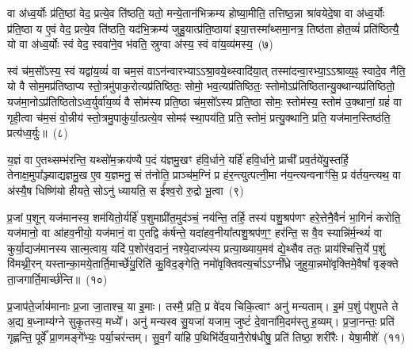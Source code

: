 वा अ॑ध्व॒र्योः प्र॑ति॒ष्ठां वेद॒ प्रत्ये॒व ति॑ष्ठति॒ यतो॒ मन्ये॒तान॑भिक्रम्य होष्या॒मीति॒ तत्तिष्ठ॒न्ना श्रा॑वयेदे॒षा वा अ॑ध्व॒र्योः प्र॑ति॒ष्ठा य ए॒वं वेद॒ प्रत्ये॒व ति॑ष्ठति॒ यद॑भि॒क्रम्य॑ जुहु॒यात्प्र॑ति॒ष्ठाया॑ इया॒त्तस्मा᳚थ्समा॒नत्र॒ तिष्ठ॑ता होत॒व्यं॑ प्रति॑ष्ठित्यै॒ यो वा अ॑ध्व॒र्योः स्वं वेद॒ स्ववा॑ने॒व भ॑वति॒ स्रुग्वा अ॑स्य॒ स्वं वा॑य॒व्य॑मस्य॒~(७)

स्वं च॑म॒सो᳚\-ऽस्य॒ स्वं यद्वा॑य॒व्यं॑ वा चम॒सं वा\-ऽन॑न्वारभ्याऽऽश्रा॒वये॒थ्\-स्वादि॑या॒त् तस्मा॑दन्वा॒रभ्या॒ऽऽश्राव्य॒ꣴ॒ स्वादे॒व नैति॒ यो वै सोम॒मप्र॑तिष्ठाप्य स्तो॒त्रमु॑पाक॒रोत्यप्र॑तिष्ठितः॒ सोमो॒ भव॒त्यप्र॑तिष्ठितः॒ स्तोमो\-ऽप्र॑तिष्ठितान्यु॒क्थान्यप्र॑तिष्ठितो॒ यज॑मा॒नो\-ऽप्र॑तिष्ठितो\-ऽध्व॒र्युर्वा॑य॒व्यं॑ वै सोम॑स्य प्रति॒ष्ठा च॑म॒सो᳚\-ऽस्य प्रति॒ष्ठा सोमः॒ स्तोम॑स्य॒ स्तोम॑ उ॒क्थानां॒ ग्रहं॑ वा गृही॒त्वा च॑म॒सं वो॒न्नीय॑ स्तो॒त्रमु॒पाकु॑र्या॒त्प्रत्ये॒व सोमꣴ॑ स्था॒पय॑ति॒ प्रति॒ स्तोमं॒ प्रत्यु॒क्थानि॒ प्रति॒ यज॑मान॒स्तिष्ठ॑ति॒ प्रत्य॑ध्व॒र्युः॥~(८)

{\anuvakamend[{ए॒व ति॑ष्ठति॒ यो वा॑य॒व्य॑मस्य॒ ग्रहं॒ वैका॒न्नविꣳ॑श॒तिश्च॑}]}%

य॒ज्ञं वा ए॒तथ्सम्भ॑रन्ति॒ यथ्सो॑म॒क्रय॑ण्यै प॒दं य॑ज्ञमु॒खꣳ ह॑वि॒र्धाने॒ यर्\mbox{}हि॑ हवि॒र्धाने॒ प्राची᳚ प्रव॒र्तये॑यु॒स्तर्\mbox{}हि॒ तेनाक्ष॒मुपा᳚ञ्ज्याद्यज्ञ\-मु॒ख ए॒व य॒ज्ञमनु॒ सं त॑नोति॒ प्राञ्च॑म॒ग्निं प्र ह॑र॒न्त्युत्पत्नी॒मा न॑य॒न्त्यन्वनाꣳ॑सि॒ प्र व॑र्तय॒न्त्यथ॒ वा अ॑स्यै॒ष धिष्णि॑यो हीयते॒ सो\-ऽनु॑ ध्यायति॒ स ई᳚श्व॒रो रु॒द्रो भू॒त्वा~(९)

प्र॒जां प॒शून् यज॑मानस्य॒ शम॑यितो॒र्यर्\mbox{}हि॑ प॒शुमाप्री॑त॒मुद॑ञ्चं॒ नय॑न्ति॒ तर्\mbox{}हि॒ तस्य॑ पशु॒श्रप॑णꣳ हरे॒त्तेनै॒वैनं॑ भा॒गिनं॑ करोति॒ यज॑मानो॒ वा आ॑हव॒नीयो॒ यज॑मानं॒ वा ए॒तद्वि क॑र्\mbox{}षन्ते॒ यदा॑हव॒नीया᳚त्पशु॒श्रप॑ण॒ꣳ॒ हर॑न्ति॒ स वै॒व स्यान्नि॑र्म॒न्थ्यं॑ वा कुर्या॒द्यज॑मानस्य सात्म॒त्वाय॒ यदि॑ प॒शोर॑व॒दानं॒ नश्ये॒दाज्य॑स्य प्रत्या॒ख्याय॒मव॑ द्ये॒थ्सैव ततः॒ प्राय॑श्चित्ति॒र्ये प॒शुं वि॑मथ्नी॒रन् यस्तान्का॒मये॒तार्ति॒मार्च्छे॑यु॒रिति॑ कु॒विद॒ङ्गेति॒ नमो॑वृक्तिवत्य॒र्चाऽऽग्नी᳚ध्रे जुहुया॒न्नमो॑वृक्तिमे॒वैषां᳚ वृङ्क्ते ता॒जगार्ति॒मार्च्छ॑न्ति॥~(१०)

{\anuvakamend[{भू॒त्वा ततः॒ षड्विꣳ॑शतिश्च}]}%

प्र॒जा\-प॑ते॒र्जाय॑मानाः प्र॒जा जा॒ताश्च॒ या इ॒माः। तस्मै॒ प्रति॒ प्र वे॑दय चिकि॒त्वाꣳ अनु॑ मन्यताम्। इ॒मं प॒शुं प॑शुपते ते अ॒द्य ब॒ध्नाम्य॑ग्ने सुकृ॒तस्य॒ मध्ये᳚। अनु॑ मन्यस्व सु॒यजा॑ यजाम॒ जुष्टं॑ दे॒वाना॑मि॒दम॑स्तु ह॒व्यम्। प्र॒जा॒नन्तः॒ प्रति॑ गृह्णन्ति॒ पूर्वे᳚ प्रा॒णमङ्गे᳚भ्यः॒ पर्या॒चर॑न्तम्। सु॒व॒र्गं या॑हि प॒थिभि॑र्देव॒यानै॒रोष॑धीषु॒ प्रति॑ तिष्ठा॒ शरी॑रैः। येषा॒मीशे॑~(११)

